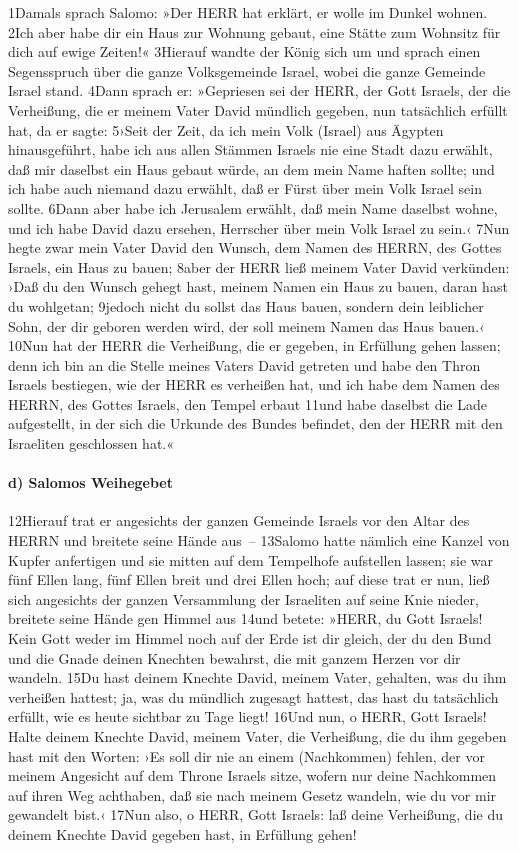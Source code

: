 1Damals sprach Salomo: »Der HERR hat erklärt, er wolle im Dunkel wohnen.
2Ich aber habe dir ein Haus zur Wohnung gebaut, eine Stätte zum Wohnsitz
für dich auf ewige Zeiten!« 3Hierauf wandte der König sich um und sprach
einen Segensspruch über die ganze Volksgemeinde Israel, wobei die ganze
Gemeinde Israel stand. 4Dann sprach er: »Gepriesen sei der HERR, der
Gott Israels, der die Verheißung, die er meinem Vater David mündlich
gegeben, nun tatsächlich erfüllt hat, da er sagte: 5›Seit der Zeit, da
ich mein Volk (Israel) aus Ägypten hinausgeführt, habe ich aus allen
Stämmen Israels nie eine Stadt dazu erwählt, daß mir daselbst ein Haus
gebaut würde, an dem mein Name haften sollte; und ich habe auch niemand
dazu erwählt, daß er Fürst über mein Volk Israel sein sollte. 6Dann aber
habe ich Jerusalem erwählt, daß mein Name daselbst wohne, und ich habe
David dazu ersehen, Herrscher über mein Volk Israel zu sein.‹ 7Nun hegte
zwar mein Vater David den Wunsch, dem Namen des HERRN, des Gottes
Israels, ein Haus zu bauen; 8aber der HERR ließ meinem Vater David
verkünden: ›Daß du den Wunsch gehegt hast, meinem Namen ein Haus zu
bauen, daran hast du wohlgetan; 9jedoch nicht du sollst das Haus bauen,
sondern dein leiblicher Sohn, der dir geboren werden wird, der soll
meinem Namen das Haus bauen.‹ 10Nun hat der HERR die Verheißung, die er
gegeben, in Erfüllung gehen lassen; denn ich bin an die Stelle meines
Vaters David getreten und habe den Thron Israels bestiegen, wie der HERR
es verheißen hat, und ich habe dem Namen des HERRN, des Gottes Israels,
den Tempel erbaut 11und habe daselbst die Lade aufgestellt, in der sich
die Urkunde des Bundes befindet, den der HERR mit den Israeliten
geschlossen hat.«

\hypertarget{d-salomos-weihegebet}{%
\paragraph{d) Salomos Weihegebet}\label{d-salomos-weihegebet}}

12Hierauf trat er angesichts der ganzen Gemeinde Israels vor den Altar
des HERRN und breitete seine Hände aus~-- 13Salomo hatte nämlich eine
Kanzel von Kupfer anfertigen und sie mitten auf dem Tempelhofe
aufstellen lassen; sie war fünf Ellen lang, fünf Ellen breit und drei
Ellen hoch; auf diese trat er nun, ließ sich angesichts der ganzen
Versammlung der Israeliten auf seine Knie nieder, breitete seine Hände
gen Himmel aus 14und betete: »HERR, du Gott Israels! Kein Gott weder im
Himmel noch auf der Erde ist dir gleich, der du den Bund und die Gnade
deinen Knechten bewahrst, die mit ganzem Herzen vor dir wandeln. 15Du
hast deinem Knechte David, meinem Vater, gehalten, was du ihm verheißen
hattest; ja, was du mündlich zugesagt hattest, das hast du tatsächlich
erfüllt, wie es heute sichtbar zu Tage liegt! 16Und nun, o HERR, Gott
Israels! Halte deinem Knechte David, meinem Vater, die Verheißung, die
du ihm gegeben hast mit den Worten: ›Es soll dir nie an einem
(Nachkommen) fehlen, der vor meinem Angesicht auf dem Throne Israels
sitze, wofern nur deine Nachkommen auf ihren Weg achthaben, daß sie nach
meinem Gesetz wandeln, wie du vor mir gewandelt bist.‹ 17Nun also, o
HERR, Gott Israels: laß deine Verheißung, die du deinem Knechte David
gegeben hast, in Erfüllung gehen!


